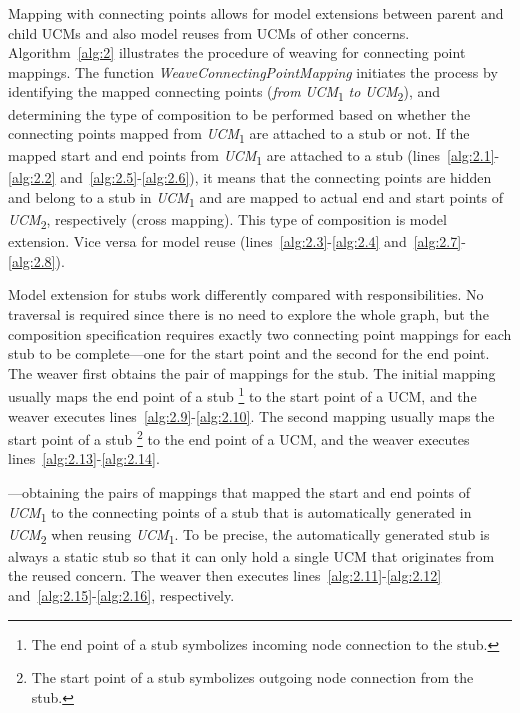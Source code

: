 Mapping with connecting points allows for model extensions between parent and child UCMs and also model reuses from UCMs of other concerns. Algorithm~\ref{alg:2} illustrates the procedure of weaving for connecting point mappings. The function \emph{WeaveConnectingPointMapping} initiates the process by identifying the mapped connecting points (\emph{from} \emph{UCM}\textsubscript{1} \emph{to} \emph{UCM}\textsubscript{2}), and determining the type of composition to be performed based on whether the connecting points mapped from \emph{UCM}\textsubscript{1} are attached to a stub or not. If the mapped start and end points from \emph{UCM}\textsubscript{1} are attached to a stub (lines~\ref{alg:2.1}-\ref{alg:2.2} and~\ref{alg:2.5}-\ref{alg:2.6}), it means that the connecting points are hidden and belong to a stub in \emph{UCM}\textsubscript{1} and are mapped to actual end and start points of \emph{UCM}\textsubscript{2}, respectively (cross mapping). This type of composition is model extension. Vice versa for model reuse (lines~\ref{alg:2.3}-\ref{alg:2.4} and~\ref{alg:2.7}-\ref{alg:2.8}).


Model extension for stubs work differently compared with responsibilities. No traversal is required since there is no need to explore the whole graph, but the composition specification requires exactly two connecting point mappings for each stub to be complete---one for the start point and the second for the end point. The weaver first obtains the pair of mappings for the stub. The initial mapping usually maps the end point of a stub \footnote{The end point of a stub symbolizes incoming node connection to the stub.} to the start point of a UCM, and the weaver executes lines~\ref{alg:2.9}-\ref{alg:2.10}. The second mapping usually maps the start point of a stub \footnote{The start point of a stub symbolizes outgoing node connection from the stub.} to the end point of a UCM, and the weaver executes lines~\ref{alg:2.13}-\ref{alg:2.14}.

---obtaining the pairs of mappings that mapped the start and end points of \emph{UCM}\textsubscript{1} to the connecting points of a stub that is automatically generated in \emph{UCM}\textsubscript{2} when reusing \emph{UCM}\textsubscript{1}. To be precise, the automatically generated stub is always a static stub so that it can only hold a single UCM that originates from the reused concern. The weaver then executes lines~\ref{alg:2.11}-\ref{alg:2.12} and~\ref{alg:2.15}-\ref{alg:2.16}, respectively.

